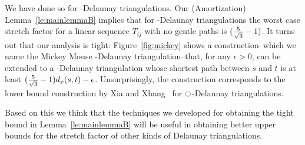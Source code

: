 We have done so for {\Large\varhexagon}-Delaunay triangulations. 
Our (Amortization) Lemma~\ref{le:mainlemmaB} implies that for 
{\Large\varhexagon}-Delaunay triangulations the worst case
stretch factor for a linear sequence $T_{ij}$ with no gentle paths is $(\frac{5}{\sqrt{3}}-1)$. 
It turns out that our analysis is tight: Figure~\ref{fig:mickey}
shows a construction--which we name the Mickey Mouse 
{\Large\varhexagon}-Delaunay triangulation--that, for any $\epsilon > 0$, 
can be extended to a
{\Large\varhexagon}-Delaunay triangulation whose shortest path between $s$ and
$t$ is at least $(\frac{5}{\sqrt{3}}-1) d_x(s,t)-\epsilon$. Unsurprisingly, the construction
corresponds to the lower bound construction by Xia and Xhang~\cite{XZ11} for 
$\ocircle$-Delaunay triangulations.

Based on this we think that the techniques we developed for obtaining the 
tight bound in Lemma~\ref{le:mainlemmaB} will be useful in obtaining better
upper bounds for the stretch factor of other kinds of Delaunay triangulations.


















